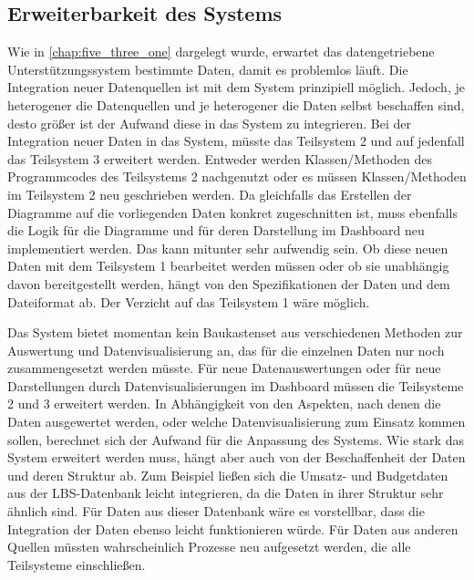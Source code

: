     \subsection{Erweiterbarkeit des Systems}
    Wie in \autoref{chap:five_three_one} dargelegt wurde, erwartet das datengetriebene Unterstützungssystem bestimmte Daten,
    damit es problemlos läuft. Die Integration neuer Datenquellen ist mit dem System prinzipiell möglich. 
    Jedoch, je heterogener die Datenquellen und je heterogener die Daten selbst beschaffen sind, 
    desto größer ist der Aufwand diese in das System zu integrieren. Bei der Integration neuer Daten in 
    das System, müsste das Teilsystem 2 und auf jedenfall das Teilsystem 3 erweitert werden.
    Entweder werden Klassen/Methoden des Programmcodes des Teilsystems 2 nachgenutzt oder es 
    müssen Klassen/Methoden im Teilsystem 2 neu geschrieben werden. Da gleichfalls das Erstellen der Diagramme auf die vorliegenden 
    Daten konkret zugeschnitten ist, muss ebenfalls die Logik für die Diagramme und für deren Darstellung im Dashboard
    neu implementiert werden. Das kann mitunter sehr aufwendig sein. Ob diese neuen Daten mit dem Teilsystem 1 bearbeitet
    werden müssen oder ob sie unabhängig davon bereitgestellt werden, hängt von den Spezifikationen der Daten und dem
    Dateiformat ab. Der Verzicht auf das Teilsystem 1 wäre möglich.

    Das System bietet momentan kein Baukastenset aus verschiedenen Methoden zur Auswertung 
    und Datenvisualisierung an, das für die einzelnen Daten nur noch zusammengesetzt
    werden müsste. Für neue Datenauswertungen oder für neue Darstellungen durch Datenvisualisierungen 
    im Dashboard müssen die Teilsysteme 2 und 3 erweitert werden. In Abhängigkeit von den Aspekten, nach denen
    die Daten ausgewertet werden, oder welche Datenvisualisierung zum Einsatz kommen sollen,
    berechnet sich der Aufwand für die Anpassung des Systems. 
    Wie stark das System erweitert werden muss, hängt aber auch von der Beschaffenheit der Daten und deren Struktur ab. 
    Zum Beispiel ließen sich die Umsatz- und Budgetdaten aus der LBS-Datenbank leicht integrieren, da die Daten 
    in ihrer Struktur sehr ähnlich sind. Für Daten aus dieser Datenbank wäre es vorstellbar,
    dass die Integration der Daten ebenso leicht funktionieren würde. Für Daten aus anderen Quellen
    müssten wahrscheinlich Prozesse neu aufgesetzt werden, die alle Teilsysteme einschließen.


